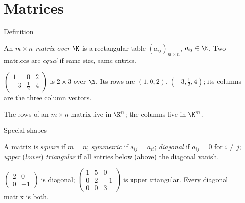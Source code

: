 \section{Matrices}

\begin{frame}{Definition}
\begin{definition}
An \emph{$m\times n$ matrix over $\K$} is a rectangular table $(a_{ij})_{m\times n}$, $a_{ij}\in\K$. Two
matrices are \emph{equal} if same size, same entries.
\end{definition}

\pause

\begin{example}
$\left(\begin{smallmatrix} 1 & 0 & 2\\ -3 & \tfrac12 & 4 \end{smallmatrix}\right)$ is $2\times 3$ over $\R$.
Its rows are $(1,0,2)$, $(-3,\tfrac12,4)$; its columns are the three column vectors.
\end{example}

\pause

\begin{fact}
The rows of an $m\times n$ matrix live in $\K^n$; the columns live in $\K^m$.
\end{fact}
\end{frame}

\begin{frame}{Special shapes}
\begin{definition}
A matrix is \emph{square} if $m=n$; \emph{symmetric} if $a_{ij}=a_{ji}$; \emph{diagonal} if $a_{ij}=0$ for
$i\neq j$; \emph{upper} (\emph{lower}) \emph{triangular} if all entries below (above) the diagonal vanish.
\end{definition}

\pause

\begin{example}
$\left(\begin{smallmatrix} 2 & 0\\ 0 & -1 \end{smallmatrix}\right)$ is diagonal;
$\left(\begin{smallmatrix} 1 & 5 & 0\\ 0 & 2 & -1\\ 0 & 0 & 3 \end{smallmatrix}\right)$ is upper triangular.
Every diagonal matrix is both.
\end{example}
\end{frame}

